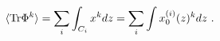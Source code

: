\begin{equation}
\langle{\rm Tr}\Phi^k\rangle = \sum_i \int_{C_i} x^k dz =\sum_i
\int x_0^{(i)}(z)^k dz\ .
\label{condensate}
\end{equation}

